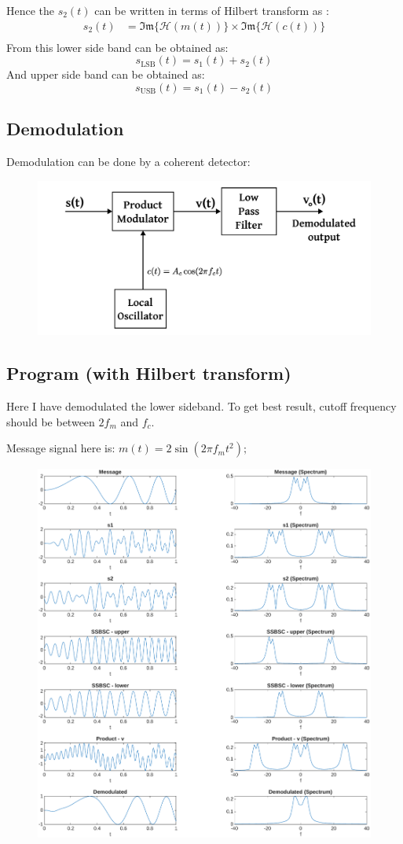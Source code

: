 Hence the $s_2(t)$ can be written in terms of Hilbert transform as :
\begin{align*}
	s_2(t) &= \mathfrak{Im}\{\mathcal{H}(m(t))\}\times \mathfrak{Im}\{\mathcal{H}(c(t))\} \\
\end{align*}
From this lower side band can be obtained as:
$$s_{\text{LSB}}(t) = s_1(t) + s_2(t)$$
And upper side band can be obtained as:
$$s_{\text{USB}}(t) = s_1(t) - s_2(t)$$

\subsection{Demodulation}
Demodulation can be done by a coherent detector:
\begin{figure}[H]
	\centering
	\includegraphics[width=.7\textwidth]{img/coh_detec.pdf}
\end{figure}

\subsection*{Program (with Hilbert transform)}
Here I have demodulated the lower sideband. To get best result, cutoff frequency should be between $2f_m$ and $f_c$.

Message signal here is: $m(t) = 2\sin(2\pi f_m t^2);$

\begin{figure}[H]
	\centering
	\includegraphics[width=\textwidth]{img/ssbsc.pdf}
\end{figure}

\pagebreak
